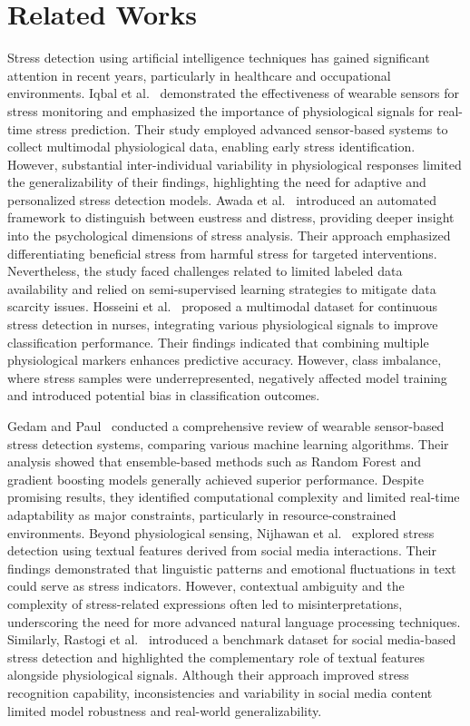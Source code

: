 \documentclass[conference]{IEEEtran}
\begin{document}
\section{Related Works}
Stress detection using artificial intelligence techniques has gained significant attention in recent years, particularly in healthcare and occupational environments. Iqbal et al.~\cite{ref1} demonstrated the effectiveness of wearable sensors for stress monitoring and emphasized the importance of physiological signals for real-time stress prediction. Their study employed advanced sensor-based systems to collect multimodal physiological data, enabling early stress identification. However, substantial inter-individual variability in physiological responses limited the generalizability of their findings, highlighting the need for adaptive and personalized stress detection models.
Awada et al.~\cite{ref2} introduced an automated framework to distinguish between eustress and distress, providing deeper insight into the psychological dimensions of stress analysis. Their approach emphasized differentiating beneficial stress from harmful stress for targeted interventions. Nevertheless, the study faced challenges related to limited labeled data availability and relied on semi-supervised learning strategies to mitigate data scarcity issues.
Hosseini et al.~\cite{ref3} proposed a multimodal dataset for continuous stress detection in nurses, integrating various physiological signals to improve classification performance. Their findings indicated that combining multiple physiological markers enhances predictive accuracy. However, class imbalance, where stress samples were underrepresented, negatively affected model training and introduced potential bias in classification outcomes.

Gedam and Paul~\cite{ref4} conducted a comprehensive review of wearable sensor-based stress detection systems, comparing various machine learning algorithms. Their analysis showed that ensemble-based methods such as Random Forest and gradient boosting models generally achieved superior performance. Despite promising results, they identified computational complexity and limited real-time adaptability as major constraints, particularly in resource-constrained environments.
Beyond physiological sensing, Nijhawan et al.~\cite{ref5} explored stress detection using textual features derived from social media interactions. Their findings demonstrated that linguistic patterns and emotional fluctuations in text could serve as stress indicators. However, contextual ambiguity and the complexity of stress-related expressions often led to misinterpretations, underscoring the need for more advanced natural language processing techniques.
Similarly, Rastogi et al.~\cite{ref6} introduced a benchmark dataset for social media-based stress detection and highlighted the complementary role of textual features alongside physiological signals. Although their approach improved stress recognition capability, inconsistencies and variability in social media content limited model robustness and real-world generalizability.
\end{document}
